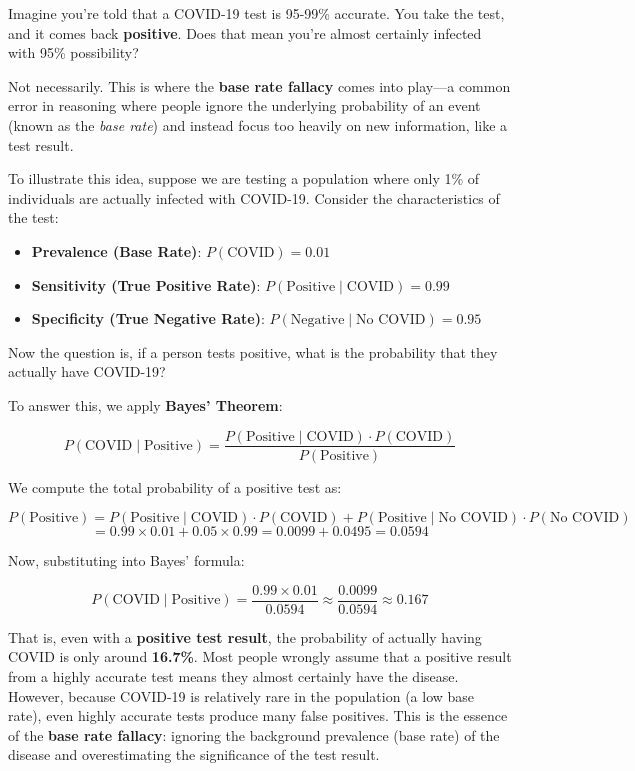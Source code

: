 \documentclass[twoside]{book}
\begin{document}
\medskip

Imagine you're told that a COVID-19 test is 95-99\% accurate. You take the test, and it comes back \textbf{positive}. Does that mean you're almost certainly infected with 95\% possibility?

Not necessarily. This is where the \textbf{base rate fallacy} comes into play—a common error in reasoning where people ignore the underlying probability of an event (known as the \textit{base rate}) and instead focus too heavily on new information, like a test result.

To illustrate this idea, suppose we are testing a population where only 1\% of individuals are actually infected with COVID-19. Consider the characteristics of the test:

\begin{itemize}
    \item \textbf{Prevalence (Base Rate)}: $P(\text{COVID}) = 0.01$
    \item \textbf{Sensitivity (True Positive Rate)}: $P(\text{Positive} \mid \text{COVID}) = 0.99$
    \item \textbf{Specificity (True Negative Rate)}: $P(\text{Negative} \mid \text{No COVID}) = 0.95$
\end{itemize}

Now the question is, if a person tests positive, what is the probability that they actually have COVID-19?


To answer this, we apply \textbf{Bayes’ Theorem}:

\[
P(\text{COVID} \mid \text{Positive}) = \frac{P(\text{Positive} \mid \text{COVID}) \cdot P(\text{COVID})}{P(\text{Positive})}
\]

We compute the total probability of a positive test as:

\[
P(\text{Positive}) = P(\text{Positive} \mid \text{COVID}) \cdot P(\text{COVID}) + P(\text{Positive} \mid \text{No COVID}) \cdot P(\text{No COVID})
\]
\[
= 0.99\times 0.01 + 0.05 \times 0.99 = 0.0099 + 0.0495 = 0.0594
\]

Now, substituting into Bayes' formula:

\[
P(\text{COVID} \mid \text{Positive}) = \frac{0.99 \times 0.01}{0.0594} \approx \frac{0.0099}{0.0594} \approx 0.167
\]

That is, even with a \textbf{positive test result}, the probability of actually having COVID is only around \textbf{16.7\%}. Most people wrongly assume that a positive result from a highly accurate test means they almost certainly have the disease. However, because COVID-19 is relatively rare in the population (a low base rate), even highly accurate tests produce many false positives. This is the essence of the \textbf{base rate fallacy}: ignoring the background prevalence (base rate) of the disease and overestimating the significance of the test result.
\end{document}
